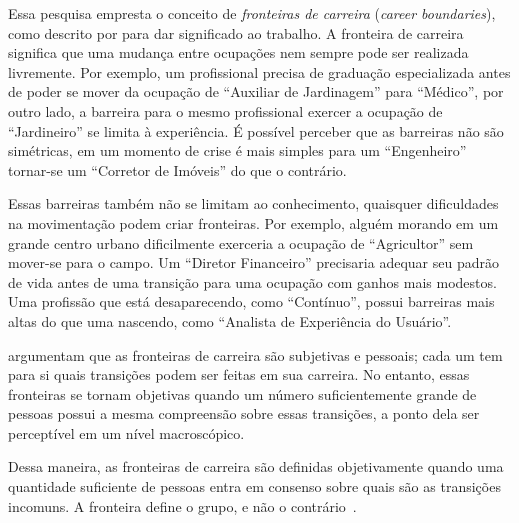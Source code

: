 \documentclass[
  article,
  11pt,
  a4paper,
  english,
  brazil,
  sumario=tradicional]{abntex2}
\begin{document}

Essa pesquisa empresta o conceito de \textit{fronteiras de carreira} (\textit{career boundaries}), como descrito por  para dar significado ao trabalho. A fronteira de carreira significa que uma mudança entre ocupações nem sempre pode ser realizada livremente. Por exemplo, um profissional precisa de graduação especializada antes de poder se mover da ocupação de \enquote{Auxiliar de Jardinagem} para \enquote{Médico}, por outro lado, a barreira para o mesmo profissional exercer a ocupação de \enquote{Jardineiro} se limita à experiência. É possível perceber que as barreiras não são simétricas, em um momento de crise é mais simples para um \enquote{Engenheiro} tornar-se um \enquote{Corretor de Imóveis} do que o contrário.

Essas barreiras também não se limitam ao conhecimento, quaisquer dificuldades na movimentação podem criar fronteiras. Por exemplo, alguém morando em um grande centro urbano dificilmente exerceria a ocupação de \enquote{Agricultor} sem mover-se para o campo. Um \enquote{Diretor Financeiro} precisaria adequar seu padrão de vida antes de uma transição para uma ocupação com ganhos mais modestos. Uma profissão que está desaparecendo, como \enquote{Contínuo}, possui barreiras mais altas do que uma nascendo, como \enquote{Analista de Experiência do Usuário}.

 argumentam que as fronteiras de carreira são subjetivas e pessoais; cada um tem para si quais transições podem ser feitas em sua carreira. No entanto, essas fronteiras se tornam objetivas quando um número suficientemente grande de pessoas possui a mesma compreensão sobre essas transições, a ponto dela ser perceptível em um nível macroscópico.

Dessa maneira, as fronteiras de carreira são definidas objetivamente quando uma quantidade suficiente de pessoas entra em consenso sobre quais são as transições incomuns. A fronteira define o grupo, e não o contrário~\cite{Gunz2007-hr}.
\end{document}
